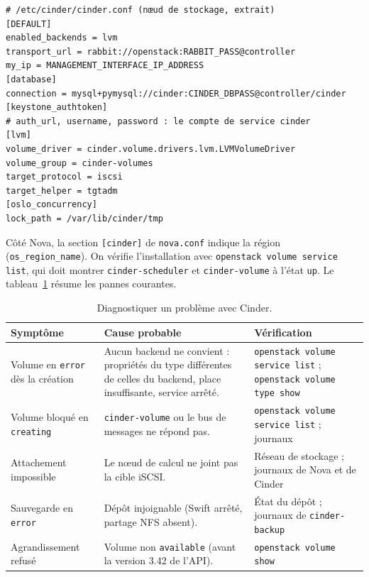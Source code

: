 \par\noindent\begin{minipage}{\linewidth}
\begin{lstlisting}
# /etc/cinder/cinder.conf (nœud de stockage, extrait)
[DEFAULT]
enabled_backends = lvm
transport_url = rabbit://openstack:RABBIT_PASS@controller
my_ip = MANAGEMENT_INTERFACE_IP_ADDRESS
[database]
connection = mysql+pymysql://cinder:CINDER_DBPASS@controller/cinder
[keystone_authtoken]
# auth_url, username, password : le compte de service cinder
[lvm]
volume_driver = cinder.volume.drivers.lvm.LVMVolumeDriver
volume_group = cinder-volumes
target_protocol = iscsi
target_helper = tgtadm
[oslo_concurrency]
lock_path = /var/lib/cinder/tmp
\end{lstlisting}
\end{minipage}\par

Côté Nova, la section \texttt{[cinder]} de \texttt{nova.conf} indique la région (\texttt{os\_region\_name}). On vérifie
l'installation avec \texttt{openstack volume service list}, qui doit montrer \texttt{cinder-scheduler} et \texttt{cinder-volume}
à l'état \texttt{up}. Le tableau~\ref{tab:ci-pannes} résume les pannes courantes.

\begin{table}[!ht]
\centering
\renewcommand{\arraystretch}{1.3}
\begin{tabular}{@{}>{\raggedright\arraybackslash}p{4.4cm}>{\raggedright\arraybackslash}p{5.8cm}>{\raggedright\arraybackslash}p{5.3cm}@{}}
\toprule
\textbf{Symptôme} & \textbf{Cause probable} & \textbf{Vérification} \\
\midrule
Volume en \texttt{error} dès la création & Aucun backend ne convient : propriétés du type différentes de celles du backend, place insuffisante, service arrêté. & \texttt{openstack volume service list} ; \texttt{openstack volume type show} \\
Volume bloqué en \texttt{creating} & \texttt{cinder-volume} ou le bus de messages ne répond pas. & \texttt{openstack volume service list} ; journaux \\
Attachement impossible & Le nœud de calcul ne joint pas la cible iSCSI. & Réseau de stockage ; journaux de Nova et de Cinder \\
Sauvegarde en \texttt{error} & Dépôt injoignable (Swift arrêté, partage NFS absent). & État du dépôt ; journaux de \texttt{cinder-backup} \\
Agrandissement refusé & Volume non \texttt{available} (avant la version 3.42 de l'API). & \texttt{openstack volume show} \\
\bottomrule
\end{tabular}
\caption{Diagnostiquer un problème avec Cinder.}
\label{tab:ci-pannes}
\end{table}

